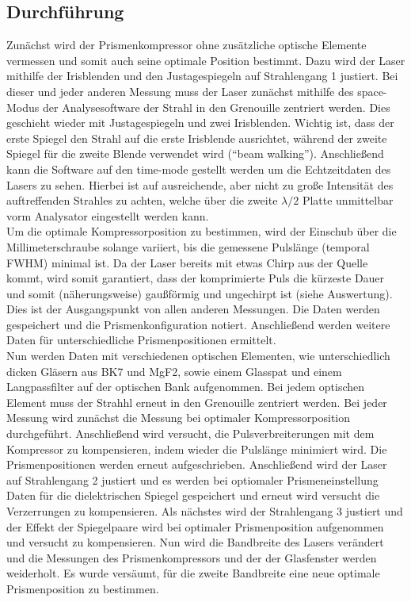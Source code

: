 \documentclass[twoside,        %
               BCOR12mm,       %
               english,ngerman, %
               fleqn,headsepline=false,footsepline=false
              ]{Vorlage/MFPREPORT}
\begin{document}
\subsection{Durchführung}
Zunächst wird der Prismenkompressor ohne zusätzliche optische Elemente
vermessen und somit auch seine optimale Position bestimmt. Dazu wird der Laser mithilfe der Irisblenden und den Justagespiegeln
auf Strahlengang 1 justiert. Bei dieser und jeder anderen Messung muss der
Laser zunächst mithilfe des space-Modus der Analysesoftware der Strahl in den
Grenouille zentriert werden. Dies geschieht wieder mit Justagespiegeln und zwei
Irisblenden. Wichtig ist, dass der erste Spiegel den Strahl auf die erste
Irisblende ausrichtet, während der zweite Spiegel für die zweite Blende
verwendet wird (``beam walking''). Anschließend kann die Software auf den
time-mode gestellt werden um die Echtzeitdaten des Lasers zu sehen. Hierbei ist
auf ausreichende, aber nicht zu große Intensität des auftreffenden Strahles zu
achten, welche über die zweite $\lambda/2$ Platte unmittelbar vorm Analysator
eingestellt werden kann.\\
Um die optimale Kompressorposition zu bestimmen, wird der Einschub über die
Millimeterschraube solange variiert, bis die gemessene Pulslänge (temporal
FWHM) minimal ist. Da der Laser bereits mit etwas Chirp aus der Quelle kommt,
wird somit garantiert, dass der komprimierte Puls die kürzeste Dauer und somit
(näherungsweise) gaußförmig und ungechirpt ist (siehe Auswertung). Dies ist der
Ausgangspunkt von allen anderen Messungen. Die Daten
werden gespeichert und die Prismenkonfiguration notiert. Anschließend werden
weitere Daten für unterschiedliche Prismenpositionen ermittelt.\\
Nun werden Daten mit
verschiedenen optischen Elementen, wie unterschiedlich dicken Gläsern aus BK7 und
MgF2, sowie einem Glasspat und einem Langpassfilter auf der optischen Bank
aufgenommen. Bei jedem optischen Element muss der Strahhl erneut in den
Grenouille zentriert werden. Bei jeder Messung wird zunächst die Messung bei
optimaler Kompressorposition durchgeführt. Anschließend wird versucht, die
Pulsverbreiterungen mit dem Kompressor zu kompensieren, indem wieder die
Pulslänge minimiert wird. Die Prismenpositionen werden erneut aufgeschrieben.
Anschließend wird der Laser auf Strahlengang 2 justiert und es werden bei
optiomaler Prismeneinstellung Daten für die dielektrischen Spiegel gespeichert
und erneut wird versucht die Verzerrungen zu kompensieren.
Als nächstes wird der Strahlengang 3 justiert und der Effekt der Spiegelpaare
wird bei optimaler Prismenposition aufgenommen und versucht zu kompensieren.
Nun wird die Bandbreite des Lasers verändert und die Messungen des
Prismenkompressors und der der Glasfenster werden weiderholt.
Es wurde versäumt, für die zweite Bandbreite eine neue optimale Prismenposition
zu bestimmen.
\end{document}
